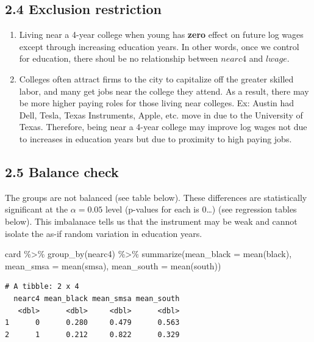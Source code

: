 \documentclass[
  letterpaper,
  DIV=11,
  numbers=noendperiod]{scrartcl}
\newenvironment{Shaded}{\begin{snugshade}}{\end{snugshade}}
\newcommand{\AttributeTok}[1]{\textcolor[rgb]{0.40,0.45,0.13}{#1}}
\newcommand{\FunctionTok}[1]{\textcolor[rgb]{0.28,0.35,0.67}{#1}}
\newcommand{\NormalTok}[1]{\textcolor[rgb]{0.00,0.23,0.31}{#1}}
\newcommand{\SpecialCharTok}[1]{\textcolor[rgb]{0.37,0.37,0.37}{#1}}
\begin{document}
\subsection{2.4 Exclusion restriction}\label{exclusion-restriction}

\begin{enumerate}
\def\labelenumi{\alph{enumi}.}
\item
  Living near a 4-year college when young has \textbf{zero} effect on
  future log wages except through increasing education years. In other
  words, once we control for education, there shoul be no relationship
  between \(nearc4\) and \(lwage\).
\item
  Colleges often attract firms to the city to capitalize off the greater
  skilled labor, and many get jobs near the college they attend. As a
  result, there may be more higher paying roles for those living near
  colleges. Ex: Austin had Dell, Tesla, Texas Instruments, Apple, etc.
  move in due to the University of Texas. Therefore, being near a 4-year
  college may improve log wages not due to increases in education years
  but due to proximity to high paying jobs.
\end{enumerate}

\subsection{2.5 Balance check}\label{balance-check}

The groups are not balanced (see table below). These differences are
statistically significant at the \(\alpha = 0.05\) level (p-values for
each is 0\ldots) (see regression tables below). This imbalanace tells us
that the instrument may be weak and cannot isolate the as-if random
variation in education years.

\begin{Shaded}
\begin{Highlighting}[]
\NormalTok{card }\SpecialCharTok{\%\textgreater{}\%}
  \FunctionTok{group\_by}\NormalTok{(nearc4) }\SpecialCharTok{\%\textgreater{}\%}
  \FunctionTok{summarize}\NormalTok{(}\AttributeTok{mean\_black =} \FunctionTok{mean}\NormalTok{(black),}
            \AttributeTok{mean\_smsa =} \FunctionTok{mean}\NormalTok{(smsa),}
            \AttributeTok{mean\_south =} \FunctionTok{mean}\NormalTok{(south))}
\end{Highlighting}
\end{Shaded}

\begin{verbatim}
# A tibble: 2 x 4
  nearc4 mean_black mean_smsa mean_south
   <dbl>      <dbl>     <dbl>      <dbl>
1      0      0.280     0.479      0.563
2      1      0.212     0.822      0.329
\end{verbatim}
\end{document}
